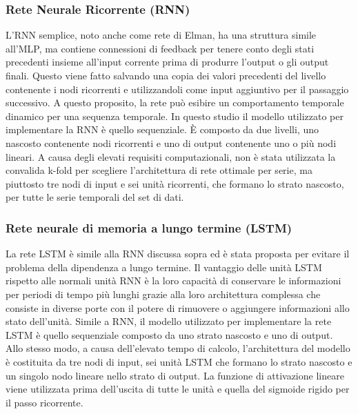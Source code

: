 \documentclass[12pt,a4paper]{report}
\begin{document}
\subsubsection{Rete Neurale Ricorrente (RNN)}
L'RNN semplice, noto anche come rete di Elman, ha una struttura simile all'MLP, ma contiene connessioni di feedback per tenere conto degli stati precedenti insieme all'input corrente prima di produrre l'output o gli output finali.
Questo viene fatto salvando una copia dei valori precedenti del livello contenente i nodi ricorrenti e utilizzandoli come input aggiuntivo per il passaggio successivo. A questo proposito, la rete può esibire un comportamento temporale dinamico per una sequenza temporale.
In questo studio il modello utilizzato per implementare la RNN è quello sequenziale. È composto da due livelli, uno nascosto contenente nodi ricorrenti e uno di output contenente uno o più nodi lineari. A causa degli elevati requisiti computazionali, non è stata utilizzata la convalida k-fold per scegliere l'architettura di rete ottimale per serie, ma piuttosto tre nodi di input e sei unità ricorrenti, che formano lo strato nascosto, per tutte le serie temporali del set di dati. 


\subsubsection{Rete neurale di memoria a lungo termine (LSTM)}
La rete LSTM è simile alla RNN discussa sopra ed è stata proposta per evitare il problema della dipendenza a lungo termine. Il vantaggio delle unità LSTM rispetto alle normali unità RNN è la loro capacità di conservare le informazioni per periodi di tempo più lunghi grazie alla loro architettura complessa che consiste in diverse porte con il potere di rimuovere o aggiungere informazioni allo stato dell'unità.
Simile a RNN, il modello utilizzato per implementare la rete LSTM è quello sequenziale composto da uno strato nascosto e uno di output. Allo stesso modo, a causa dell'elevato tempo di calcolo, l'architettura del modello è costituita da tre nodi di input, sei unità LSTM che formano lo strato nascosto e un singolo nodo lineare nello strato di output. La funzione di attivazione lineare viene utilizzata prima dell'uscita di tutte le unità e quella del sigmoide rigido per il passo ricorrente. 
\end{document}
